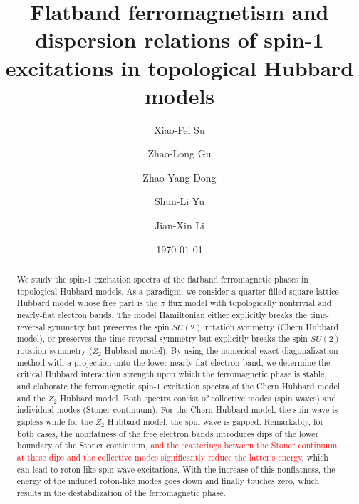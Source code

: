 \documentclass[amsmath,superscriptaddress,showpacs,aps,prb,twocolumn]{revtex4-1}
\begin{document}
\title{Flatband ferromagnetism and dispersion relations of spin-1 excitations in topological Hubbard models}
\author{Xiao-Fei Su}
\author{Zhao-Long Gu}
\author{Zhao-Yang Dong}
\author{Shun-Li Yu}
\author{Jian-Xin Li}
\date{\today}

\begin{abstract}
\par We study the spin-1 excitation spectra of the flatband ferromagnetic phases in topological Hubbard models. As a paradigm, we consider a quarter filled square lattice Hubbard model whose free part is the $\pi$ flux model with topologically nontrivial and nearly-flat electron bands. The model Hamiltonian either explicitly breaks the time-reversal symmetry but preserves the spin $SU(2)$ rotation symmetry (Chern Hubbard model), or preserves the time-reversal symmetry but explicitly breaks the spin $SU(2)$ rotation symmetry ($Z_2$ Hubbard model). By using the numerical exact diagonalization method with a projection onto the lower nearly-flat electron band, we determine the critical Hubbard interaction strength upon which the ferromagnetic phase is stable, and elaborate the ferromagnetic spin-1 excitation spectra of the Chern Hubbard model and the $Z_2$ Hubbard model. Both spectra consist of collective modes (spin waves) and individual modes (Stoner continuum). For the Chern Hubbard model, the spin wave is gapless while for the $Z_2$ Hubbard model, the spin wave is gapped. Remarkably, for both cases, the nonflatness of the free electron bands introduces dips of the lower boundary of the Stoner continuum, \textcolor{red}{and the scatterings between the Stoner continuum at these dips and the collective modes significantly reduce the latter's energy}, which can lead to roton-like spin wave excitations. With the increase of this nonflatness, the energy of the induced roton-like modes goes down and finally touches zero, which results in the destabilization of the ferromagnetic phase.
\end{abstract}
\maketitle
\end{document}
